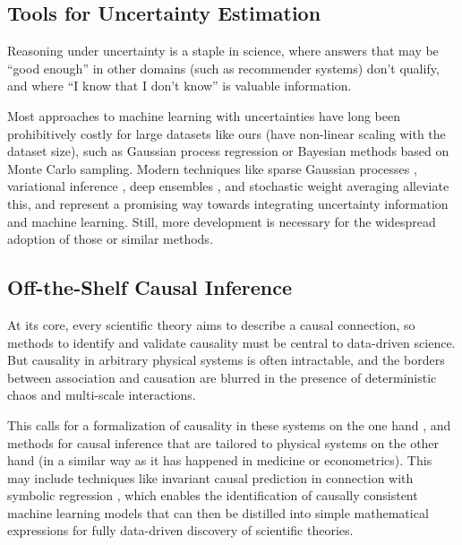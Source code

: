 \subsection{Tools for Uncertainty Estimation}

Reasoning under uncertainty is a staple in science, where answers that may be \enquote{good enough} in other domains (such as recommender systems) don't qualify, and where \enquote{I know that I don't know} is valuable information.

Most approaches to machine learning with uncertainties have long been prohibitively costly for large datasets like ours (\ie have non-linear scaling with the dataset size), such as Gaussian process regression or Bayesian methods based on Monte Carlo sampling. Modern techniques like sparse Gaussian processes \citep{leibfried_2020}, variational inference \citep{blei_variational_2017}, deep ensembles \citep{lakshminarayanan_simple_2017}, and stochastic weight averaging \citep{maddox_simple_2019,wilson_bayesian_2020} alleviate this, and represent a promising way towards integrating uncertainty information and machine learning. Still, more development is necessary for the widespread adoption of those or similar methods.

\subsection{Off-the-Shelf Causal Inference}

At its core, every scientific theory aims to describe a causal connection, so methods to identify and validate causality must be central to data-driven science.
But causality in arbitrary physical systems is often intractable, and the borders between association and causation are blurred in the presence of deterministic chaos and multi-scale interactions.

This calls for a formalization of causality in these systems on the one hand \citep[\eg as in][]{peters_causal_2020}, and methods for causal inference that are tailored to physical systems on the other hand (in a similar way as it has happened in medicine or econometrics). This may include techniques like invariant causal prediction \citep{peters_causal_2016} in connection with symbolic regression \citep{cranmer_discovering_2020}, which enables the identification of causally consistent machine learning models that can then be distilled into simple mathematical expressions for fully data-driven discovery of scientific theories.

